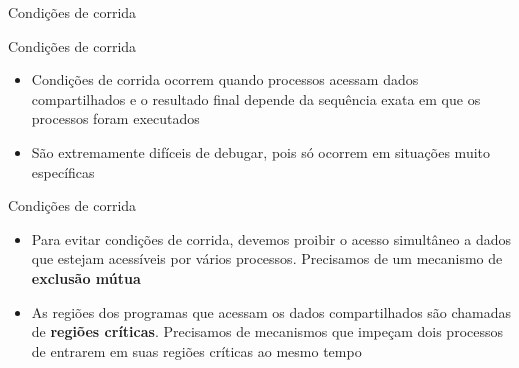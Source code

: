 \documentclass{beamer}
\begin{document}
\begin{frame}{Condições de corrida}
\begin{figure}
	\end{figure}
\end{frame}
\begin{frame}{Condições de corrida}
	\begin{itemize}
		\item Condições de corrida ocorrem quando processos acessam dados compartilhados e o resultado final depende da sequência exata em que os processos foram executados
		\item São extremamente difíceis de debugar, pois só ocorrem em situações muito específicas
	\end{itemize}
\end{frame}
\begin{frame}{Condições de corrida}
	\begin{itemize}
		\item Para evitar condições de corrida, devemos proibir o acesso simultâneo a dados que estejam acessíveis por vários processos. Precisamos de um mecanismo de \textbf{exclusão mútua}
		\item As regiões dos programas que acessam os dados compartilhados são chamadas de \textbf{regiões críticas}. Precisamos de mecanismos que impeçam dois processos de entrarem em suas regiões críticas ao mesmo tempo
	\end{itemize}
\end{frame}
\end{document}
